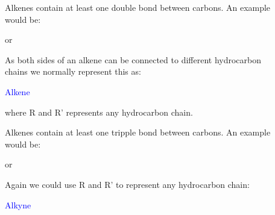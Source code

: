 \documentclass[main.tex]{subfiles}
\begin{document}
\sloppy
\begin{description}
\item[] Alkenes contain at least one double bond between carbons. An example would be:
\begin{center}\hspace{1cm} or\hspace{1cm}\end{center}
As both sides of an alkene can be connected to different hydrocarbon chains we normally represent this as:
\begin{center}\hspace{0.5cm}\textcolor{blue}{Alkene}\end{center}
where R and R' represents any hydrocarbon chain.



\item[] Alkenes contain at least one tripple bond between carbons. An example would be:
\begin{center}\hspace{1cm} or\hspace{1cm}\end{center}
Again we could use R and R' to represent any hydrocarbon chain:
\begin{center}\hspace{0.5cm}\textcolor{blue}{Alkyne}\end{center}


\end{description}
\end{document}
